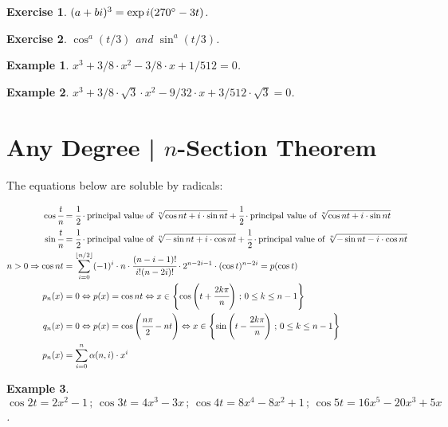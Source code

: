 \documentclass[11pt,a4paper]{article}
\newtheorem{exercise}{Exercise}
\newtheorem{example}{Example}
\begin{document}
\begin{exercise}
$(a + bi)^3 = \exp i(270\degree - 3t)$.
\end{exercise}

\begin{exercise}
$\cos^a (t/3)$ and $\sin^a (t/3)$.
\end{exercise}

\begin{example}
$x^3 + 3/8 \cdot x^2 - 3/8 \cdot x + 1/512 = 0$.
\end{example}

\begin{example}
$x^3 + 3/8 \cdot \sqrt{3} \cdot x^2 - 9/32 \cdot x + 3/512 \cdot \sqrt{3} = 0$.
\end{example}

\section{Any Degree | $n$-Section Theorem}

The equations below are soluble by radicals:

\begin{align}
\cos \cfrac{t}{n} &= \cfrac{1}{2} \cdot \text{principal value of } \sqrt[n]{\cos nt + i \cdot \sin nt} + \cfrac{1}{2} \cdot \text{principal value of } \sqrt[n]{\cos nt + i \cdot \sin nt} \\
\sin \cfrac{t}{n} &= \cfrac{1}{2} \cdot \text{principal value of } \sqrt[n]{- \sin nt + i \cdot \cos nt} + \cfrac{1}{2} \cdot \text{principal value of } \sqrt[n]{- \sin nt - i \cdot \cos nt} \\
n > 0 \Rightarrow \cos nt &= \sum_{i = 0}^{\lfloor n/2 \rfloor} (-1)^i \cdot n \cdot \cfrac{(n - i - 1)!}{i! (n - 2i)!} \cdot 2^{n - 2i - 1} \cdot (\cos t)^{n - 2i} = p(\cos t) \\
p_n(x) &= 0 \Leftrightarrow p(x) = \cos nt \Leftrightarrow x \in \left\{ \cos \left(t + \cfrac{2k\pi}{n} \right) \,;\, 0 \le k \le n - 1 \right\} \\
q_n(x) &= 0 \Leftrightarrow p(x) = \cos \left(\cfrac{n\pi}{2} - nt \right) \Leftrightarrow x \in \left\{ \sin \left(t - \cfrac{2k\pi}{n} \right) \,;\, 0 \le k \le n - 1 \right\} \\
p_n(x) &= \sum_{i = 0}^n \alpha(n, i)\cdot x^i
\end{align}

\begin{example}
$\cos 2t = 2x^2 - 1\,;\, \cos 3t = 4x^3 - 3x\,;\, \cos 4t = 8x^4 - 8x^2 + 1\,;\, \cos 5t = 16x^5 - 20x^3 + 5x$.
\end{example}
\end{document}
